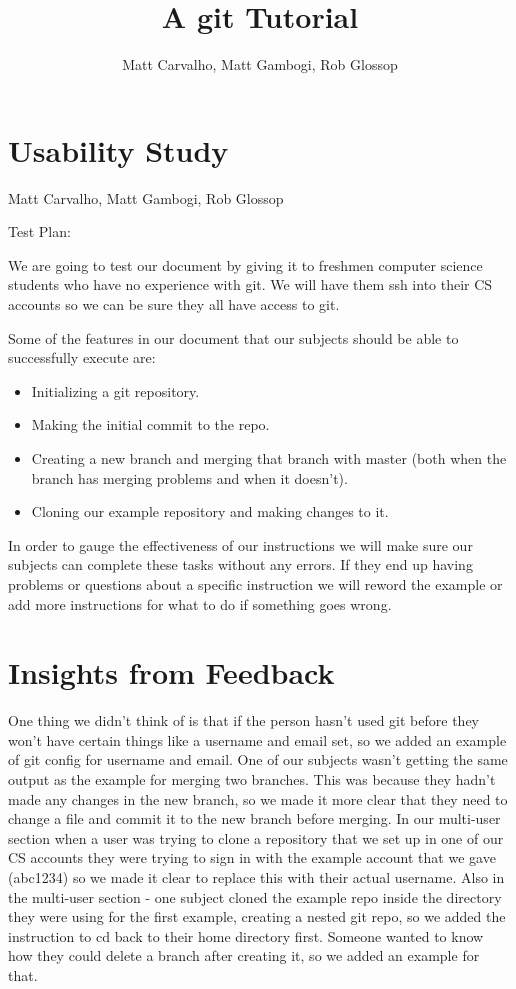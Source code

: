 \documentclass[11pt]{report}
\title{A git Tutorial}
\author{Matt Carvalho, Matt Gambogi, Rob Glossop}
\begin{document}
\section*{Usability Study}
Matt Carvalho, Matt Gambogi, Rob Glossop


Test Plan:

We are going to test our document by giving it to freshmen computer
science students who have no experience with git. We will have them
ssh into their CS accounts so we can be sure they all have access to
git.

Some of the features in our document that our subjects should be able
to successfully execute are:

\begin{itemize}
\item Initializing a git repository.

\item Making the initial commit to the repo.

\item Creating a new branch and merging that branch with master (both when
  the branch has merging problems and when it doesn’t).
  
\item Cloning our example repository and making changes to it.
\end{itemize}
In order to gauge the effectiveness of our instructions we will make
sure our subjects can complete these tasks without any errors. If they
end up having problems or questions about a specific instruction
we will reword the example or add more instructions for what to do if something goes wrong.\\


\section{Insights from Feedback}
One thing we didn't think of is that if the person hasn't used git before they won't
have certain things like a username and email set, so we added an example of git config for
username and email. One of our subjects wasn't getting the same output as the example 
for merging two branches. This was because they hadn't made any changes in the new branch,
so we made it more clear that they need to change a file and commit it to the new branch 
before merging. In our multi-user section when a user was trying to clone a repository that we 
set up in one of our CS accounts they were trying to sign in with the example account that we gave
(abc1234) so we made it clear to replace this with their actual username. Also in the multi-user section - 
one subject cloned the example repo inside the directory they were using for the first example, creating
a nested git repo, so we added the instruction to cd back to their home directory first. Someone
wanted to know how they could delete a branch after creating it, so we added an example for that.
\end{document}
